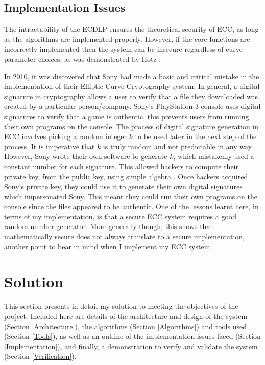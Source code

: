 \documentclass[12pt,a4paper]{article}
\begin{document}
\subsection{Implementation Issues} \noindent
The intractability of the ECDLP ensures the theoretical security of ECC, 
as long as the algorithms are implemented properly. 
However, if the core functions are incorrectly implemented then the system can be insecure regardless of curve parameter choices, 
as was demonstrated by Hotz \citeyear{hotz2010console}. 

In 2010, it was discovered that Sony had made a basic and critical mistake in the implementation of their Elliptic Curve Cryptography system. 
In general, a digital signature in cryptography allows a user to verify that a file they downloaded was created by a particular person/company. 
Sony's PlayStation 3 console uses digital signatures to verify that a game is authentic, 
this prevents users from running their own programs on the console. 
The process of digital signature generation in ECC involves picking a random integer $k$ to be used later in the next step of the process. 
It is imperative that $k$ is truly random and not predictable in any way. 
However, Sony wrote their own software to generate $k$, which mistakenly used a constant number for each signature. 
This allowed hackers to compute their private key, from the public key, using simple algebra \cite{hotz2010console}. 
Once hackers acquired Sony's private key, they could use it to generate their own digital signatures which impersonated Sony. 
This meant they could run their own programs on the console since the files appeared to be authentic. 
One of the lessons learnt here, in terms of my implementation, 
is that a secure ECC system requires a good random number generator. 
More generally though, this shows that mathematically secure does not always translate to a secure implementation, 
another point to bear in mind when I implement my ECC system. 



\section{Solution} \noindent
This section presents in detail my solution to meeting the objectives of the project. 
Included here are details of the architecture and design of the system (Section \ref{Architecture}), 
the algorithms (Section \ref{Algorithms}) and tools used (Section \ref{Tools}), 
as well as an outline of the implementation issues faced (Section \ref{Implementation}), 
and finally, a demonstration to verify and validate the system (Section \ref{Verification}). 
\end{document}
